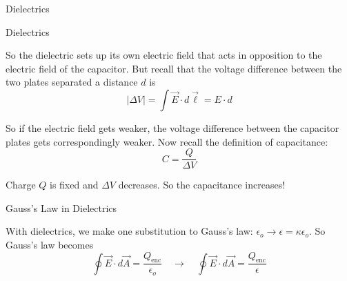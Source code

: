 \documentclass{beamer}
\begin{document}
\begin{frame}{Dielectrics}
\begin{figure}[H]
\end{figure}

\end{frame}

\begin{frame}{Dielectrics}

So the dielectric sets up its own electric field that acts in opposition to the electric field of the capacitor. But recall that the voltage difference between the two plates separated a distance $d$ is
\begin{equation*}
    \left| \Delta V \right| = \int \vec{E} \cdot d\vec{\ell} = E \cdot d 
\end{equation*}

So if the electric field gets weaker, the voltage difference between the capacitor plates gets correspondingly weaker. Now recall the definition of capacitance:
\begin{equation*}
    C = \frac{Q}{\Delta V}
\end{equation*}

Charge $Q$ is fixed and $\Delta V$ decreases. So the capacitance increases!

\end{frame}

\begin{frame}{Gauss's Law in Dielectrics}

With dielectrics, we make one substitution to Gauss's law: $\epsilon_o \to \epsilon = \kappa \epsilon_o$. So Gauss's law becomes
\begin{equation*}
    \oint \vec{E} \cdot d\vec{A} = \frac{Q_{\text{enc}}}{\epsilon_o} \quad \to \quad \oint \vec{E} \cdot d\vec{A} = \frac{Q_{\text{enc}}}{\epsilon}
\end{equation*}

\end{frame}
\end{document}

